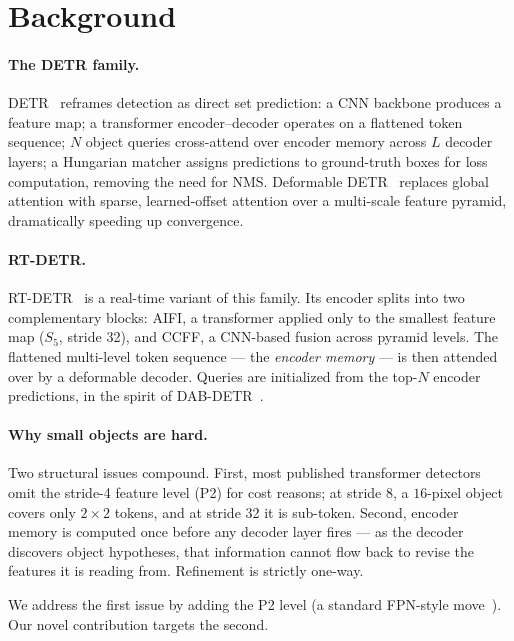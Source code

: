 \section{Background}
\label{sec:background}

\paragraph{The DETR family.} DETR~\cite{carion2020detr} reframes detection as direct set prediction: a CNN backbone produces a feature map; a transformer encoder--decoder operates on a flattened token sequence; $N$ object queries cross-attend over encoder memory across $L$ decoder layers; a Hungarian matcher assigns predictions to ground-truth boxes for loss computation, removing the need for NMS. Deformable DETR~\cite{zhu2021deformable} replaces global attention with sparse, learned-offset attention over a multi-scale feature pyramid, dramatically speeding up convergence.

\paragraph{RT-DETR.} RT-DETR~\cite{lyu2024rtdetr} is a real-time variant of this family. Its encoder splits into two complementary blocks: AIFI, a transformer applied only to the smallest feature map ($S_5$, stride 32), and CCFF, a CNN-based fusion across pyramid levels. The flattened multi-level token sequence --- the \emph{encoder memory} --- is then attended over by a deformable decoder. Queries are initialized from the top-$N$ encoder predictions, in the spirit of DAB-DETR~\cite{liu2022dabdetr}.

\paragraph{Why small objects are hard.} Two structural issues compound. First, most published transformer detectors omit the stride-4 feature level (P2) for cost reasons; at stride 8, a $16$-pixel object covers only $2{\times}2$ tokens, and at stride 32 it is sub-token. Second, encoder memory is computed once before any decoder layer fires --- as the decoder discovers object hypotheses, that information cannot flow back to revise the features it is reading from. Refinement is strictly one-way.

We address the first issue by adding the P2 level (a standard FPN-style move~\cite{lin2017fpn}). Our novel contribution targets the second.
